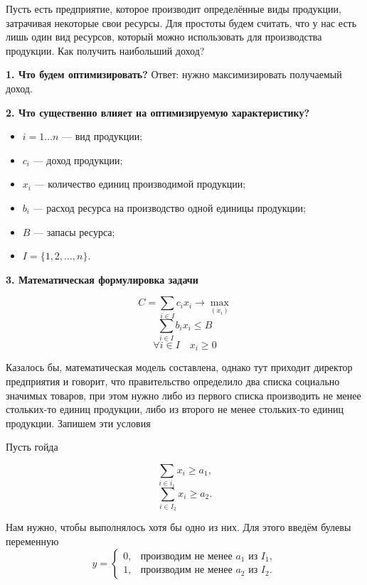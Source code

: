 
Пусть есть предприятие, которое производит определённые виды продукции, затрачивая некоторые свои ресурсы. Для простоты будем считать, что у нас есть лишь один вид ресурсов, который можно использовать для производства продукции. Как получить наибольший доход?

\textbf{1. Что будем оптимизировать?} Ответ: нужно максимизировать получаемый доход.

\textbf{2. Что существенно влияет на оптимизируемую характеристику?}

\begin{itemize}[nosep]
	\item $i = 1 \dots n$ --- вид продукции;
	
	\item $c_i$ --- доход продукции;
	
	\item $x_i$ --- количество единиц производимой продукции;
	
	\item $b_i$ --- расход ресурса на производство одной единицы продукции;
	
	\item $B$ --- запасы ресурса;
	
	\item $I = \{1, 2, \dots, n\}$.
\end{itemize}

\textbf{3. Математическая формулировка задачи}

\[
	C = \sum_{i \in I}c_i x_i \to \max_{(x_i)}
\]
\[
	\sum_{i \in I}b_i x_i \le B
\]
\[
	\forall i \in I \quad x_i \ge 0
\]

Казалось бы, математическая модель составлена, однако тут приходит директор предприятия и говорит, что правительство определило два списка социально значимых товаров, при этом нужно либо из первого списка производить не менее стольких-то единиц продукции, либо из второго не менее стольких-то единиц продукции. Запишем эти условия

Пусть гойда

\[
	\sum_{i \in i_1} x_i \ge a_1,
\]
\[
	\sum_{i \in I_2} x_i \ge a_2.
\]

Нам нужно, чтобы выполнялось хотя бы одно из них. Для этого введём булевы переменную
\[
	y = \begin{cases}
		0, & \text{производим не менее $a_1$ из $I_1$}, \\
		1, & \text{производим не менее $a_2$ из $I_2$}.
	\end{cases}
\]

